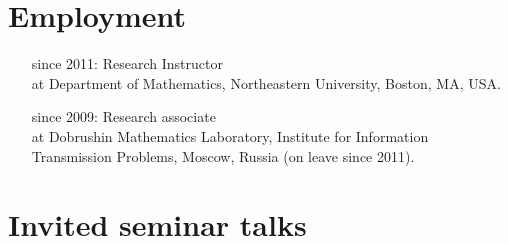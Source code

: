 \documentclass[letterpaper,11pt]{article}
\begin{document}
\section*{Employment}

\begin{itemize}
\item[since 2011:]
Research Instructor\\ at
Department of Mathematics,
Northeastern University, Boston, MA, USA.

\item[since 2009:]
Research associate\\
at
Dobrushin Mathematics Laboratory,
Institute for Information Transmission Problems, Moscow, Russia (on leave since 2011).
\end{itemize}

\section*{Invited seminar talks}
\end{document}
